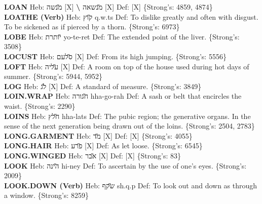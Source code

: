 {\textbf{LOAN} Heb: {\large\H מנשה} {[}X{]} \textbf{\textbackslash{}} {\large\H מנשאה} {[}X{]} Def: {[}X{]} \{Strong's: 4859, 4874\}\hfill{}\\

\textbf{LOATHE (Verb)} Heb: {\large\H קוץ} q.w.ts Def: To dislike greatly and often with disgust. To be sickened as if pierced by a thorn. \{Strong's: 6973\}\hfill{}\\

\textbf{LOBE} Heb: {\large\H יותרת} yo-te-ret Def: The extended point of the liver. \{Strong's: 3508\}\hfill{}\\

\textbf{LOCUST} Heb: {\large\H סלעם} {[}X{]} Def: From its high jumping. \{Strong's: 5556\}\hfill{}\\

\textbf{LOFT} Heb: {\large\H עליה} {[}X{]} Def: A room on top of the house used during hot days of summer. \{Strong's: 5944, 5952\}\hfill{}\\

\textbf{LOG} Heb: {\large\H לג} {[}X{]} Def: A standard of measure. \{Strong's: 3849\}\hfill{}\\

\textbf{LOIN.WRAP} Heb: {\large\H חגורה} hha-go-rah Def: A sash or belt that encircles the waist. \{Strong's: 2290\}\hfill{}\\

\textbf{LOINS} Heb: {\large\H חלץ} hha-lats Def: The pubic region; the generative organs. In the sense of the next generation being drawn out of the loins. \{Strong's: 2504, 2783\}\hfill{}\\

\textbf{LONG.GARMENT} Heb: {\large\H מד} {[}X{]} Def: {[}X{]} \{Strong's: 4055\}\hfill{}\\

\textbf{LONG.HAIR} Heb: {\large\H פרע} {[}X{]} Def: As let loose. \{Strong's: 6545\}\hfill{}\\

\textbf{LONG.WINGED} Heb: {\large\H אבר} {[}X{]} Def: {[}X{]} \{Strong's: 83\}\hfill{}\\

\textbf{LOOK} Heb: {\large\H הינה} hi-ney Def: To ascertain by the use of one's eyes. \{Strong's: 2009\}\hfill{}\\

\textbf{LOOK.DOWN (Verb)} Heb: {\large\H שקף} sh.q.p Def: To look out and down as through a window. \{Strong's: 8259\}\hfill{}\\

}
